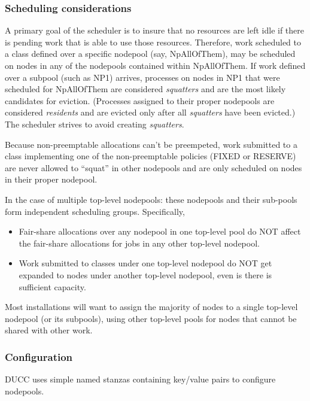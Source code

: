 \subsubsection{Scheduling considerations}
    A primary goal of the scheduler is to insure that no resources are left idle if there
    is pending work that is able to use those resources.  Therefore, work scheduled to
    a class defined over a specific nodepool (say, NpAllOfThem), may be scheduled on nodes
    in any of the nodepools contained within NpAllOfThem.  If work defined over a
    subpool (such as NP1) arrives, processes on nodes in NP1 that were scheduled for
    NpAllOfThem are considered {\em squatters} and are the most likely candidates for
    eviction. (Processes assigned to their proper nodepools are considered {\em residents}
    and are evicted only after all {\em squatters} have been evicted.)  The scheduler strives
    to avoid creating {\em squatters}.

    Because non-preemptable allocations can't be preempeted, work submitted to a class
    implementing one of the non-preemptable policies (FIXED or RESERVE) are never allowed
    to ``squat'' in other nodepools and are only scheduled on nodes in their
    proper nodepool.

    In the case of multiple top-level nodepools: these nodepools and their sub-pools
    form independent scheduling groups.  Specifically,
    \begin{itemize}
        \item Fair-share allocations over any nodepool in one top-level pool do NOT affect the
          fair-share allocations for jobs in any other top-level nodepool. 

        \item Work submitted to classes under one top-level nodepool do NOT get expanded to
          nodes under another top-level nodepool, even is there is sufficient capacity.
    \end{itemize}

    Most installations will want to assign the majority of nodes to a single top-level
    nodepool (or its subpools), using other top-level pools for nodes that cannot be
    shared with other work.

\subsubsection{Configuration}
\label{subsubsec:nodepool.configuration}
    DUCC uses simple named stanzas containing key/value pairs to configure nodepools.

